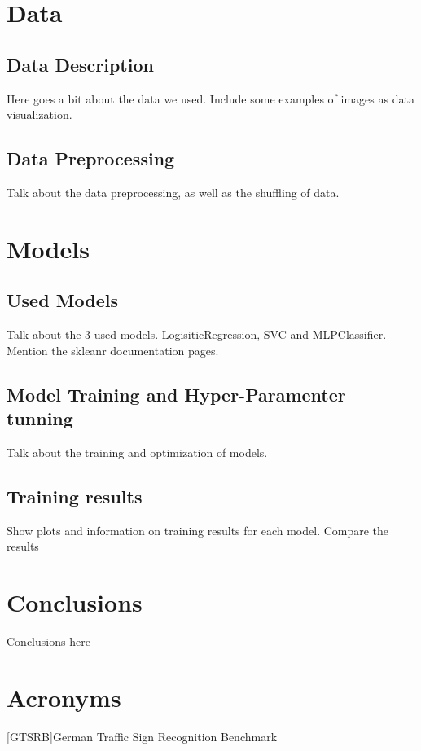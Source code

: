 \documentclass[12pt]{article}
\begin{document}
\tableofcontents

\clearpage
{}


\section{Data}
\label{section.data}

\subsection{Data Description}
\label{subsection.data_description}
Here goes a bit about the data we used. Include some examples of images as data visualization.\cite{kaggle_dataset}
\subsection{Data Preprocessing}
\label{subsection.data_preprocessing}
Talk about the data preprocessing, as well as the shuffling of data.

\clearpage
\section{Models}
\label{section.models}

\subsection{Used Models}
\label{subsection.used_models}
Talk about the 3 used models. LogisiticRegression, SVC and MLPClassifier. Mention the skleanr documentation pages.
\subsection{Model Training and Hyper-Paramenter tunning}
\label{subsection.model_training}
Talk about the training and optimization of models.
\subsection{Training results}
\label{subsection.training_results}
Show plots and information on training results for each model. Compare the results

\clearpage
\section{Conclusions}
\label{section.conclusions}
Conclusions here


\clearpage
\section*{Acronyms}
    \begin{acronym}
        [GTSRB]{German Traffic Sign Recognition Benchmark}
    \end{acronym}

\printbibliography
\end{document}
